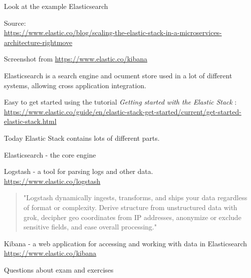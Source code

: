 \documentclass[Screen16to9,17pt]{foils}
\begin{document}

Look at the example Elasticsearch

Source:\\
{\footnotesize\url{https://www.elastic.co/blog/scaling-the-elastic-stack-in-a-microservices-architecture-rightmove}}




Screenshot from \url{https://www.elastic.co/kibana}

Elasticsearch is a search engine and ocument store used in a lot of different systems, allowing cross application integration.


Easy to get started using the tutorial \emph{Getting started with the Elastic Stack} :\\
{\footnotesize\url{https://www.elastic.co/guide/en/elastic-stack-get-started/current/get-started-elastic-stack.html}}

Today Elastic Stack contains lots of different parts.

\begin{list2}
\item Elasticsearch - the core engine
\item Logstash - a tool for parsing logs and other data.\\
\url{https://www.elastic.co/logstash}
\begin{quote}
"Logstash dynamically ingests, transforms, and ships your data regardless of format or complexity. Derive structure from unstructured data with grok, decipher geo coordinates from IP addresses, anonymize or exclude sensitive fields, and ease overall processing."
\end{quote}
\item Kibana - a web application for accessing and working with data in Elasticsearch\\
\url{https://www.elastic.co/kibana}
\end{list2}






Questions about exam and exercises




\end{document}
